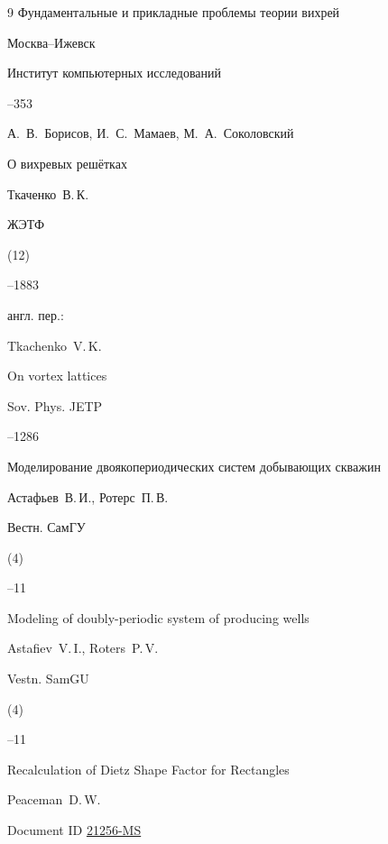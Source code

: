 \begin{thebibliography}{9}
\inbook Фундаментальные и прикладные проблемы теории вихрей

\publaddr Москва--Ижевск

\publ Институт компьютерных исследований


--353

\eds А.~В.~Борисов, И.~С.~Мамаев, М.~А.~Соколовский 




\paper О вихревых решётках

\by Ткаченко~В.\,К.

\jour ЖЭТФ



(12)

--1883

\transl англ. пер.:~

\by Tkachenko~V.\,K.

\paper On vortex lattices

\jour Sov. Phys. JETP



–1286




\paper Моделирование двоякопериодических систем добывающих скважин

\by Астафьев~В.\,И., Ротерс~П.\,В.

\jour Вестн. СамГУ


 (4)

--11

\misctransl

\paper Modeling of doubly-periodic system of producing wells

\by Astafiev~V.\,I., Roters~P.\,V.

\jour Vestn. SamGU


 (4)

--11




\eprint Recalculation of Dietz Shape Factor for Rectangles

\by Peaceman~D.\,W.

\eprintinfo Document ID \href{http://www.onepetro.org/mslib/servlet/onepetropreview?id=00021256}{21256-MS}







\end{thebibliography}





